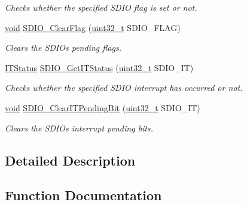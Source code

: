\begin{DoxyCompactItemize}
\begin{DoxyCompactList}\small\item\em Checks whether the specified S\+D\+IO flag is set or not. \end{DoxyCompactList}\item 
\hyperlink{usb__devapi_8h_afabf60e7f57651d6d595a02c75f07cd0}{void} \hyperlink{group___s_d_i_o___private___functions_ga7aff4efdeb528229135f9f285e53518a}{S\+D\+I\+O\+\_\+\+Clear\+Flag} (\hyperlink{_p_e___types_8h_a33594304e786b158f3fb30289278f5af}{uint32\+\_\+t} S\+D\+I\+O\+\_\+\+F\+L\+AG)
\begin{DoxyCompactList}\small\item\em Clears the S\+D\+IO\textquotesingle{}s pending flags. \end{DoxyCompactList}\item 
\hyperlink{agilefox_2library_2inc_2stm32f10x__type_8h_aacbd7ed539db0aacd973a0f6eca34074}{I\+T\+Status} \hyperlink{group___s_d_i_o___private___functions_ga2d64af1f3df0f99cb518f9a89bbd02ac}{S\+D\+I\+O\+\_\+\+Get\+I\+T\+Status} (\hyperlink{_p_e___types_8h_a33594304e786b158f3fb30289278f5af}{uint32\+\_\+t} S\+D\+I\+O\+\_\+\+IT)
\begin{DoxyCompactList}\small\item\em Checks whether the specified S\+D\+IO interrupt has occurred or not. \end{DoxyCompactList}\item 
\hyperlink{usb__devapi_8h_afabf60e7f57651d6d595a02c75f07cd0}{void} \hyperlink{group___s_d_i_o___private___functions_ga048e07fd86321cd01b2a22c071c3149b}{S\+D\+I\+O\+\_\+\+Clear\+I\+T\+Pending\+Bit} (\hyperlink{_p_e___types_8h_a33594304e786b158f3fb30289278f5af}{uint32\+\_\+t} S\+D\+I\+O\+\_\+\+IT)
\begin{DoxyCompactList}\small\item\em Clears the S\+D\+IO\textquotesingle{}s interrupt pending bits. \end{DoxyCompactList}\end{DoxyCompactItemize}


\subsection{Detailed Description}


\subsection{Function Documentation}
